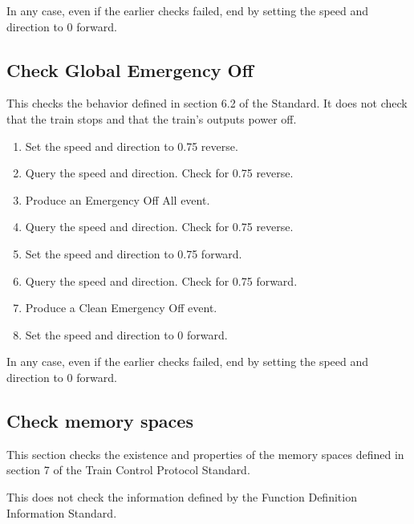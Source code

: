 In any case, even if the earlier checks failed, end by setting the speed 
and direction to 0 forward.

\subsection{Check Global Emergency Off}

This checks the behavior defined in section 6.2 of the Standard.
It does not check that the train stops and that the train's outputs power off.

\begin{enumerate}

    \item Set the speed and direction to 0.75 reverse.

    \item Query the speed and direction. Check for 0.75 reverse.

    \item Produce an Emergency Off All event.

    \item Query the speed and direction. Check for 0.75 reverse.

    \item Set the speed and direction to 0.75 forward.

    \item Query the speed and direction. Check for 0.75 forward.

    \item Produce a Clean Emergency Off event.
    
    \item Set the speed and direction to 0 forward.

\end{enumerate}

In any case, even if the earlier checks failed, end by setting the speed 
and direction to 0 forward.

\subsection{Check memory spaces}

This section checks the existence and properties of the memory spaces defined in section 7
of the Train Control Protocol Standard.

This does not check the information defined by the 
Function Definition Information Standard.

